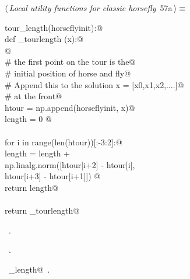\documentclass[11.5pt]{report}
\begin{document}
\begin{flushleft} \small\label{scrap81}\raggedright\small
{} $\langle\,${\itshape Local utility functions for classic horsefly}\nobreak\ {\footnotesize {57a}}$\,\rangle\equiv$
\vspace{-1ex}
\begin{list}{}{} \item
\mbox{}\verb@def tour_length(horseflyinit):@\\
\mbox{}\verb@   def _tourlength (x):@\\
\mbox{}\verb@         @\\
\mbox{}\verb@        # the first point on the tour is the@\\
\mbox{}\verb@        # initial position of horse and fly@\\
\mbox{}\verb@        # Append this to the solution x = [x0,x1,x2,....]@\\
\mbox{}\verb@        # at the front@\\
\mbox{}\verb@        htour = np.append(horseflyinit, x)@\\
\mbox{}\verb@        length = 0 @\\
\mbox{}\verb@@\\
\mbox{}\verb@        for i in range(len(htour))[:-3:2]:@\\
\mbox{}\verb@                length = length + \@\\
\mbox{}\verb@                         np.linalg.norm([htour[i+2] - htour[i], \@\\
\mbox{}\verb@                                         htour[i+3] - htour[i+1]]) @\\
\mbox{}\verb@        return length@\\
\mbox{}\verb@@\\
\mbox{}\verb@   return _tourlength@\\
\mbox{}\verb@@{\NWsep}
\end{list}
\vspace{-1.5ex}
\footnotesize
\begin{list}{}{\setlength{\itemsep}{-\parsep}\setlength{\itemindent}{-\leftmargin}}
\item \NWtxtMacroDefBy\ .
\item \NWtxtMacroRefIn\ .
\item \NWtxtIdentsDefed\nobreak\  \verb@tour_length@\nobreak\ .
\item{}
\end{list}
\vspace{4ex}
\end{flushleft}
\end{document}

